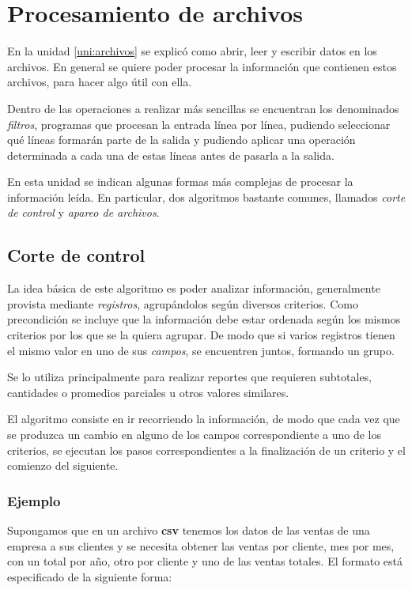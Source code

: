 \chapter{Procesamiento de archivos}

En la unidad \ref{uni:archivos} se explicó como abrir, leer y escribir datos en
los archivos.  En general se quiere poder procesar la información que contienen
estos archivos, para hacer algo útil con ella.

Dentro de las operaciones a realizar más sencillas se encuentran los
denominados {\it filtros}, programas que procesan la entrada línea por
línea, pudiendo seleccionar qué líneas formarán parte de la salida y
pudiendo aplicar una operación determinada a cada una de estas líneas antes
de pasarla a la salida.

En esta unidad se indican algunas formas más complejas de procesar la
información leída.  En particular, dos algoritmos bastante comunes, llamados
\textit {corte de control} y \textit{apareo de archivos}.

\section{Corte de control}

La idea básica de este algoritmo es poder analizar información, generalmente
provista mediante \textit{registros}, agrupándolos según diversos criterios.
Como precondición se incluye que la información debe estar ordenada según
los mismos criterios por los que se la quiera agrupar. De modo que si
varios registros tienen el mismo valor en uno de sus \textit{campos}, se
encuentren juntos, formando un grupo.

Se lo utiliza principalmente para realizar reportes que requieren
subtotales, cantidades o promedios parciales u otros valores similares.

El algoritmo consiste en ir recorriendo la información, de modo que cada vez
que se produzca un cambio en alguno de los campos correspondiente a uno de los
criterios, se ejecutan los pasos correspondientes a la finalización de un
criterio y el comienzo del siguiente.

\subsection*{Ejemplo}

Supongamos que en un archivo \textbf{csv} tenemos los datos de las ventas de
una empresa a sus clientes y se necesita obtener las ventas por cliente,
mes por mes, con un total por año, otro por cliente y uno de las ventas
totales. El formato está especificado de la siguiente forma:


